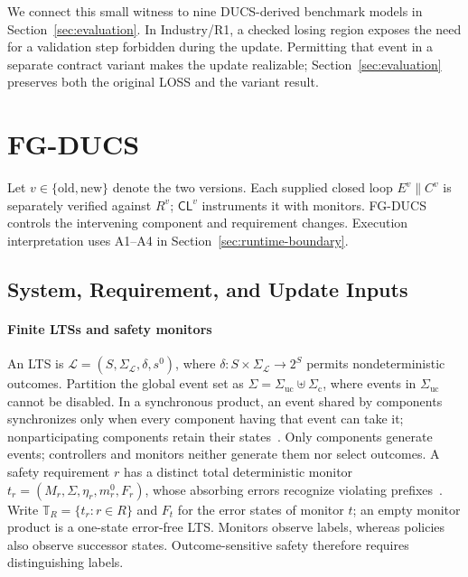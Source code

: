 \documentclass[acmsmall,screen,review,anonymous]{acmart}
\newcommand{\Sigmauc}{\Sigma_{\mathrm{uc}}}
\newcommand{\Sigmac}{\Sigma_{\mathrm{c}}}
\begin{document}
We connect this small witness to nine DUCS-derived benchmark models in Section~\ref{sec:evaluation}. In Industry/R1, a checked losing region exposes the need for a validation step forbidden during the update. Permitting that event in a separate contract variant makes the update realizable; Section~\ref{sec:evaluation} preserves both the original LOSS and the variant result.

\FloatBarrier

\section{FG-DUCS}
\label{sec:formalization}

Let $v\in\{\mathrm{old},\mathrm{new}\}$ denote the two versions. Each supplied closed loop $E^v\parallel C^v$ is separately verified against $R^v$; $\mathsf{CL}^v$ instruments it with monitors. FG-DUCS controls the intervening component and requirement changes. Execution interpretation uses A1--A4 in Section~\ref{sec:runtime-boundary}.

\subsection{System, Requirement, and Update Inputs}

\paragraph{Finite LTSs and safety monitors}
An LTS is $\mathcal L=(S,\Sigma_{\mathcal L},\delta,s^0)$, where
$\delta:S\times\Sigma_{\mathcal L}\to2^S$ permits nondeterministic outcomes. Partition the global event set as
$\Sigma=\Sigmauc\uplus\Sigmac$, where events in $\Sigmauc$ cannot be disabled. In a synchronous product, an event shared by components synchronizes only when every component having that event can take it; nonparticipating components retain their states~\cite{MageeKramer2006}.
Only components generate events; controllers and monitors neither generate them nor select outcomes. A safety requirement $r$ has a distinct total deterministic monitor $t_r=(M_r,\Sigma,\eta_r,m_r^0,F_r)$, whose absorbing errors recognize violating prefixes~\cite{AlpernSchneider1985,KupfermanVardi2001}. Write $\mathbb T_R=\{t_r:r\in R\}$ and $F_t$ for the error states of monitor $t$; an empty monitor product is a one-state error-free LTS. Monitors observe labels, whereas policies also observe successor states. Outcome-sensitive safety therefore requires distinguishing labels.
\end{document}
